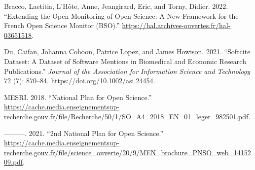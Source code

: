 \documentclass[
]{article}
\newlength{\cslhangindent}
\newenvironment{cslreferences}%
  {\setlength{\parindent}{0pt}%
  \everypar{\setlength{\hangindent}{\cslhangindent}}\ignorespaces}%
  {\par}
\begin{document}
\hypertarget{refs}{}
\begin{cslreferences}
\leavevmode\hypertarget{ref-bracco_extending_2022}{}%
Bracco, Laetitia, L'Hôte, Anne, Jeangirard, Eric, and Torny, Didier.
2022. ``Extending the Open Monitoring of Open Science: A New Framework
for the French Open Science Monitor (BSO).''
\url{https://hal.archives-ouvertes.fr/hal-03651518}.

\leavevmode\hypertarget{ref-du_softcite_2021}{}%
Du, Caifan, Johanna Cohoon, Patrice Lopez, and James Howison. 2021.
``Softcite Dataset: A Dataset of Software Mentions in Biomedical and
Economic Research Publications.'' \emph{Journal of the Association for
Information Science and Technology} 72 (7): 870--84.
\url{https://doi.org/10.1002/asi.24454}.

\leavevmode\hypertarget{ref-mesri_national_2018}{}%
MESRI. 2018. ``National Plan for Open Science.''
\url{https://cache.media.enseignementsup-recherche.gouv.fr/file/Recherche/50/1/SO_A4_2018_EN_01_leger_982501.pdf}.

\leavevmode\hypertarget{ref-mesri_2nd_2021}{}%
---------. 2021. ``2nd National Plan for Open Science.''
\url{https://cache.media.enseignementsup-recherche.gouv.fr/file/science_ouverte/20/9/MEN_brochure_PNSO_web_1415209.pdf}.
\end{cslreferences}
\end{document}
